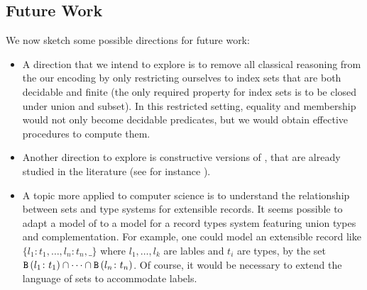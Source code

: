 \documentclass[sigplan,10pt,anonymous,review]{acmart}%
\begin{document}
\subsection{Future Work}
\label{sub:future}
We now sketch some possible directions for future work:
\begin{itemize}
  \item A direction that we intend to explore is to remove all classical reasoning from the our encoding by only restricting ourselves to index sets that are both decidable and finite (the only required property for index sets is to be closed under union and subset). In this restricted setting, equality and membership would not only become decidable predicates, but we would obtain effective procedures to compute them.
  \item Another direction to explore is constructive versions of \NFX, that are already studied in the literature (see for instance \cite{XXX}).
  \item A topic more applied to computer science is to understand the relationship between \NFO{} sets and type systems for extensible records. It seems possible to adapt a model of \NFO{} to a model for a record types system featuring union types and complementation. For example, one could model an extensible record like $\{l_1\colon t_1, \ldots, l_n\colon t_n, \_\}$ where $l_1,\ldots,l_k$ are lables and $t_i$ are types, by the \NFO{} set $\text{\texttt{B}}\,(l_1\colon t_1)\cap\cdots\cap \text{\texttt{B}}\,(l_n\colon t_n)$. Of course, it would be necessary to extend the language of sets to accommodate labels.
\end{itemize}







\appendix
\end{document}
